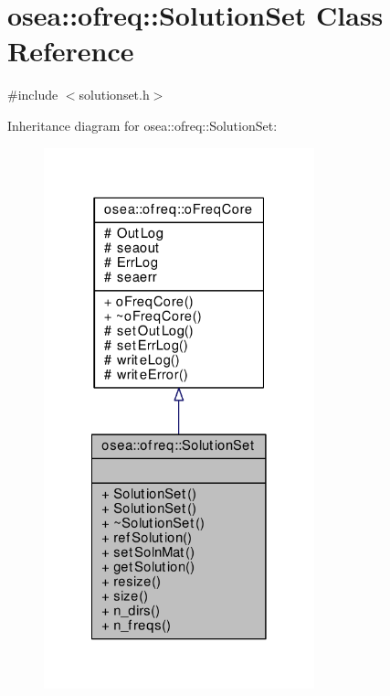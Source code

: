\hypertarget{classosea_1_1ofreq_1_1_solution_set}{\section{osea\-:\-:ofreq\-:\-:Solution\-Set Class Reference}
\label{classosea_1_1ofreq_1_1_solution_set}
}


{\ttfamily \#include $<$solutionset.\-h$>$}



Inheritance diagram for osea\-:\-:ofreq\-:\-:Solution\-Set\-:\nopagebreak
\begin{figure}[H]
\begin{center}
\leavevmode
\includegraphics[width=222pt]{classosea_1_1ofreq_1_1_solution_set__inherit__graph}
\end{center}
\end{figure}
